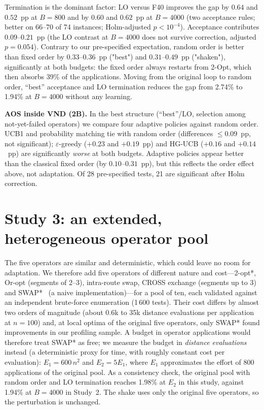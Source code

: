 \documentclass[conference]{IEEEtran}
\begin{document}
Termination is the dominant factor: LO versus F40 improves the gap by $0.64$ and $0.52$~pp at $B=800$ and by $0.60$ and $0.62$~pp at $B=4000$ (two acceptance rules; better on 66--70 of 74 instances; Holm-adjusted $p<10^{-4}$). Acceptance contributes $0.09$--$0.21$~pp (the LO contrast at $B=4000$ does not survive correction, adjusted $p=0.054$). Contrary to our pre-specified expectation, random order is better than fixed order by $0.33$--$0.36$~pp ("best") and $0.31$--$0.49$~pp ("shaken"), significantly at both budgets: the fixed order always restarts from 2-Opt, which then absorbs 39\% of the applications. Moving from the original loop to random order, ``best'' acceptance and LO termination reduces the gap from 2.74\% to 1.94\% at $B=4000$ without any learning.

\textbf{AOS inside VND (2B).} In the best structure (``best''/LO, selection among not-yet-failed operators) we compare four adaptive policies against random order. UCB1 and probability matching tie with random order (differences $\le 0.09$~pp, not significant); $\varepsilon$-greedy ($+0.23$ and $+0.19$~pp) and HG-UCB ($+0.16$ and $+0.14$~pp) are significantly \emph{worse} at both budgets. Adaptive policies appear better than the classical fixed order (by $0.10$--$0.31$~pp), but this reflects the order effect above, not adaptation. Of 28 pre-specified tests, 21 are significant after Holm correction.

\section{Study 3: an extended, heterogeneous operator pool}
The five operators are similar and deterministic, which could leave no room for adaptation. We therefore add five operators of different nature and cost---2-opt*, Or-opt (segments of 2--3), intra-route swap, CROSS exchange (segments up to 3) and SWAP*~\cite{vidal2022} (a naive implementation)---for a pool of ten, each validated against an independent brute-force enumeration (1\,600 tests). Their cost differs by almost two orders of magnitude (about 0.6k to 35k distance evaluations per application at $n=100$) and, at local optima of the original five operators, only SWAP* found improvements in our profiling sample. A budget in operator applications would therefore treat SWAP* as free; we measure the budget in \emph{distance evaluations} instead (a deterministic proxy for time, with roughly constant cost per evaluation): $E_1=600\,n^2$ and $E_2=5E_1$, where $E_1$ approximates the effort of 800 applications of the original pool. As a consistency check, the original pool with random order and LO termination reaches 1.98\% at $E_2$ in this study, against 1.94\% at $B=4000$ in Study~2. The shake uses only the original five operators, so the perturbation is unchanged.
\end{document}
